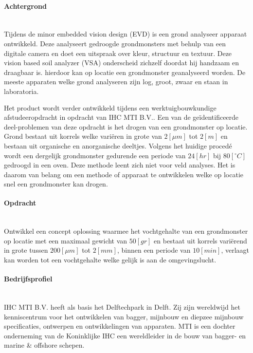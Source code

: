 \documentclass[a4paper,11pt]{../LatexDocStructures/MTItexMemo} %
\renewcommand{\deg}{\ensuremath{^{\circ}}\xspace}
\begin{document}
\maketitle %

\paragraph{Achtergrond}\mbox{} \\
Tijdens de minor embedded vision design (EVD) is een grond analyseer apparaat ontwikkeld. Deze analyseert gedroogde grondmonsters met behulp van een digitale camera en doet een uitspraak over kleur, structuur en textuur. Deze vision based soil analyzer (VSA) onderscheid zichzelf doordat hij handzaam en draagbaar is. hierdoor kan op locatie een grondmonster geanalyseerd worden. De meeste apparaten welke grond analyseren zijn log, groot, zwaar en staan in laboratoria.

Het product wordt verder ontwikkeld tijdens een werktuigbouwkundige afstudeeropdracht in opdracht van IHC MTI B.V.. Een van de ge\"identificeerde deel-problemen van deze opdracht is het drogen van een grondmonster op locatie. Grond bestaat uit korrels welke vari\"eren in grote van $ 2 [\mu m] $ tot $ 2 [m] $ en bestaan uit organische en anorganische deeltjes. Volgens het huidige proced\'e wordt een dergelijk grondmonster gedurende een periode van $ 24 [hr] $ bij $ 80 [ \deg C] $ gedroogd in een oven. Deze methode leent zich niet voor veld analyses. Het is daarom van belang om een methode of apparaat te ontwikkelen welke op locatie snel een grondmonster kan drogen.

\paragraph{Opdracht}\mbox{} \\
Ontwikkel een concept oplossing waarmee het vochtgehalte van een grondmonster op locatie met een maximaal gewicht van $ 50 [gr] $ en bestaat uit korrels vari\"erend in grote tussen $ 200 [\mu m] $ tot $ 2 [mm] $, binnen een periode van $ 10 [min] $, verlaagt kan worden tot een vochtgehalte welke gelijk is aan de omgevingslucht.

\paragraph{Bedrijfsprofiel}\mbox{} \\
IHC MTI B.V. heeft als basis het Delftechpark in Delft. Zij zijn wereldwijd het kenniscentrum voor het ontwikkelen van bagger, mijnbouw en diepzee mijnbouw specificaties, ontwerpen en ontwikkelingen van apparaten. MTI is een dochter onderneming van de Koninklijke IHC een wereldleider in de bouw van bagger- en marine \& offshore schepen.
\end{document}
